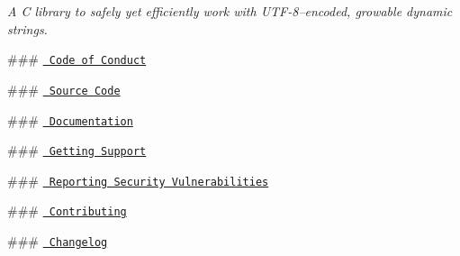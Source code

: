 \label{index_md_README}%
%
 {\itshape A C library to safely yet efficiently work with UTF-\/8–encoded, growable dynamic strings.}


\begin{DoxyItemize}
\item \#\#\# \href{https://github.com/SFM61319/ds/blob/main/CODE_OF_CONDUCT.md}{\texttt{ Code of Conduct}}
\item \#\#\# \href{https://github.com/SFM61319/ds}{\texttt{ Source Code}}
\item \#\#\# \href{https://sfm61319.github.io/ds/}{\texttt{ Documentation}}
\item \#\#\# \href{https://github.com/SFM61319/ds/blob/main/SUPPORT.md}{\texttt{ Getting Support}}
\item \#\#\# \href{https://github.com/SFM61319/ds/blob/main/SECURITY.md}{\texttt{ Reporting Security Vulnerabilities}}
\item \#\#\# \href{https://github.com/SFM61319/ds/blob/main/CONTRIBUTING.md}{\texttt{ Contributing}}
\item \#\#\# \href{https://github.com/SFM61319/ds/blob/main/CHANGELOG.md}{\texttt{ Changelog}} 
\end{DoxyItemize}